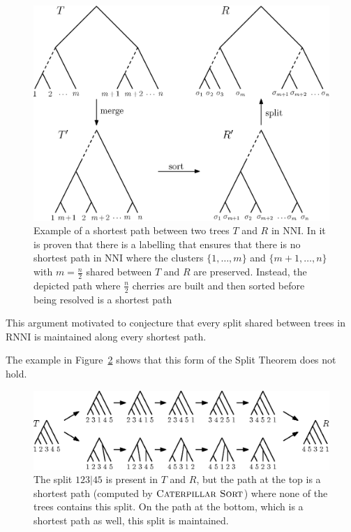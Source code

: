 \documentclass{amsart}
\newcommand{\nni}{\mathrm{NNI}}
\newcommand{\rnni}{\mathrm{RNNI}}
\newcommand{\csort}{\textsc{Caterpillar Sort}}
\begin{document}
\begin{figure}[H]
\centering
\includegraphics[width=.8\textwidth]{NNI_NP_proof}
\vspace{12pt}
\caption{Example of a shortest path between two trees $T$ and $R$ in $\nni$.
In \autocite{Li1996-zw} it is proven that there is a labelling that ensures that there is no shortest path in $\nni$ where the clusters $\{1, \ldots, m\}$ and $\{m+1, \ldots, n\}$ with $m = \frac{n}{2}$ shared between $T$ and $R$ are preserved.
Instead, the depicted path where $\frac{n}{2}$ cherries are built and then sorted before being resolved is a shortest path}
\label{fig:NNI_NP_proof}
\end{figure}

This argument motivated \textcite[Conjecture~9]{Gavryushkin2018-ol} to conjecture that every split shared between trees in $\rnni$ is maintained along every shortest path.

The example in Figure~\ref{fig:splitthm_counterexample} shows that this form of the Split Theorem does not hold.

\begin{figure}[H]
\centering
\includegraphics[width=\textwidth]{splitthm_counterexample}
\vspace{12pt}
\caption{The split $123|45$ is present in $T$ and $R$, but the path at the top is a shortest path (computed by $\csort$) where none of the trees contains this split.
On the path at the bottom, which is a shortest path as well, this split is maintained.}
\label{fig:splitthm_counterexample}
\end{figure}
\end{document}
